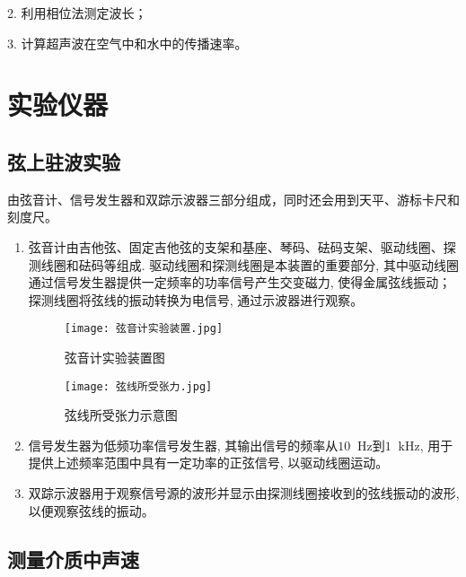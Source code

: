 \documentclass[11pt]{article}
\newcommand*{\unit}[1]{\mathop{}\!\mathrm{#1}}
\begin{document}
2. 利用相位法测定波长；

3. 计算超声波在空气中和水中的传播速率。

\section{实验仪器}

\subsection{弦上驻波实验}

由弦音计、信号发生器和双踪示波器三部分组成，同时还会用到天平、游标卡尺和刻度尺。

\begin{enumerate}

    \item 弦音计由吉他弦、固定吉他弦的支架和基座、琴码、砝码支架、驱动线圈、探测线圈和砝码等组成. 驱动线圈和探测线圈是本装置的重要部分, 其中驱动线圈通过信号发生器提供一定频率的功率信号产生交变磁力, 使得金属弦线振动；探测线圈将弦线的振动转换为电信号, 通过示波器进行观察。
    
    \begin{figure}[H]
        \begin{minipage}[t]{0.6\linewidth}
            \centering
            \texttt{[image: 弦音计实验装置.jpg]}
            \caption{弦音计实验装置图}
        \end{minipage}
        \begin{minipage}[t]{0.39\linewidth}
            \centering
            \texttt{[image: 弦线所受张力.jpg]}
            \caption{弦线所受张力示意图}
        \end{minipage}
    \end{figure}

    \item 信号发生器为低频功率信号发生器, 其输出信号的频率从$10\unit{Hz}$到$1\unit{kHz}$, 用于提供上述频率范围中具有一定功率的正弦信号, 以驱动线圈运动。
	
    \item 双踪示波器用于观察信号源的波形并显示由探测线圈接收到的弦线振动的波形, 以便观察弦线的振动。

\end{enumerate}

\subsection{测量介质中声速}
\end{document}
